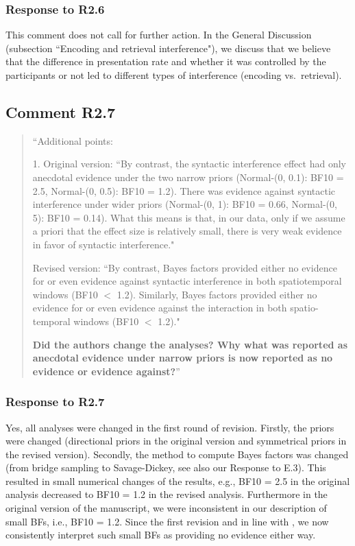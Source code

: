 \documentclass[12pt]{article}
\begin{document}
\subsubsection*{Response to R2.6}
This comment does not call for further action. In the General Discussion (subsection ``Encoding and retrieval interference"), we discuss that we believe that the difference in presentation rate and whether it was controlled by the participants or not led to different types of interference (encoding vs.\ retrieval).
 
\subsection*{Comment R2.7}
\begin{quote}
``Additional points:

1. Original version: ``By contrast, the syntactic interference effect had only anecdotal evidence under the two narrow priors (Normal-(0, 0.1): BF10 = 2.5, Normal-(0, 0.5): BF10 = 1.2). There was evidence against syntactic interference under wider priors (Normal-(0, 1): BF10 = 0.66, Normal-(0, 5): BF10 = 0.14). What this means is that, in our data, only if we assume a priori that the effect size is relatively small, there is very weak evidence in favor of syntactic interference."

Revised version: ``By contrast, Bayes factors provided either no evidence for or even evidence against syntactic interference in both spatiotemporal windows (BF10 $<$ 1.2). Similarly, Bayes factors provided either no evidence for or even evidence against the interaction in both spatio-temporal windows (BF10 $<$ 1.2)."

\textbf{Did the authors change the analyses? Why what was reported as anecdotal evidence under narrow priors is now reported as no evidence or evidence against?}''
\end{quote}
\subsubsection*{Response to R2.7}
Yes, all analyses were changed in the first round of revision. Firstly, the priors were changed (directional priors in the original version and symmetrical priors in the revised version). Secondly, the method to compute Bayes factors was changed (from bridge sampling to Savage-Dickey, see also our Response to E.3). This resulted in small numerical changes of the results, e.g., BF10 = 2.5 in the original analysis decreased to BF10 = 1.2 in the revised analysis. Furthermore in the original version of the manuscript, we were inconsistent in our description of small BFs, i.e., BF10 = 1.2. Since the first revision and in line with \cite{lee2014bayesian}, we now consistently interpret such small BFs as providing no evidence either way.
\end{document}
